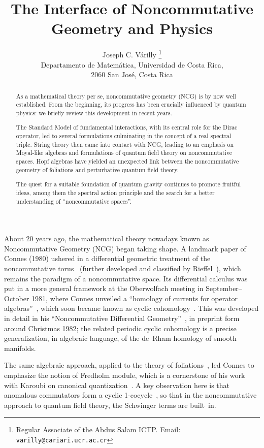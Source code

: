\documentclass[a4paper,12pt]{article}
\title{The Interface of Noncommutative Geometry and Physics}
\author{Joseph C. V\'arilly%
  \thanks{Regular Associate of the Abdus Salam ICTP.\quad
          Email: \texttt{varilly@cariari.ucr.ac.cr}}\\[1pc]
Departamento de Matem\'atica, Universidad de Costa Rica,\\
2060 San Jos\'e, Costa Rica}
\makeatletter
\providecommand{\1}{\mathbf{1}}         %
\providecommand{\7}{\dagger}            %
\providecommand{\8}{\bullet}            %
\renewcommand{\.}{\cdot}            %
\renewcommand{\:}{\colon}           %
\def\section{\@startsection{section}{1}{\z@}{-3.5ex plus -1ex minus
 -.2ex}{2.3ex plus .2ex}{\large\bf}}
\makeatother
\begin{document}
\maketitle

\begin{abstract}
As a mathematical theory per se, noncommutative geometry (NCG) is by
now well established. From the beginning, its progress has been
crucially influenced by quantum physics: we briefly review this
development in recent years.

The Standard Model of fundamental interactions, with its central role
for the Dirac operator, led to several formulations culminating in the
concept of a real spectral triple. String theory then came into
contact with NCG, leading to an emphasis on Moyal-like algebras and
formulations of quantum field theory on noncommutative spaces. Hopf
algebras have yielded an unexpected link between the noncommutative
geometry of foliations and perturbative quantum field theory.

The quest for a suitable foundation of quantum gravity continues to
promote fruitful ideas, among them the spectral action principle and
the search for a better understanding of ``noncommutative spaces''.
\end{abstract}


\section{Introduction}

About 20 years ago, the mathematical theory nowadays known as
Noncommutative Geometry (NCG) began taking shape. A landmark paper of
Connes (1980) ushered in a differential geometric treatment of the
noncommutative torus~\cite{ConnesTorus} (further developed and
classified by Rieffel~\cite{RieffelRot}), which remains the paradigm
of a noncommutative space. Its differential calculus was put in a more
general framework at the Oberwolfach meeting in September--October
1981, where Connes unveiled a ``homology of currents for operator
algebras''~\cite{ConnesObW}, which soon became known as cyclic
cohomology~\cite{ConnesLambda}. This was developed in detail in his
``Noncommutative Differential Geometry''~\cite{ConnesNCDiffG}, in
preprint form around Christmas 1982; the related periodic cyclic
cohomology is a precise generalization, in algebraic language, of the
de~Rham homology of smooth manifolds.

The same algebraic approach, applied to the theory of
foliations~\cite{ConnesFoli}, led Connes to emphasize the notion of
Fredholm module, which is a cornerstone of his work with Karoubi on
canonical quantization~\cite{ConnesKaFred}. A key observation here is
that anomalous commutators form a cyclic 1-cocycle~\cite{ArakiSchw}, so
that in the noncommutative approach to quantum field theory, the
Schwinger terms are built~in.
\end{document}
